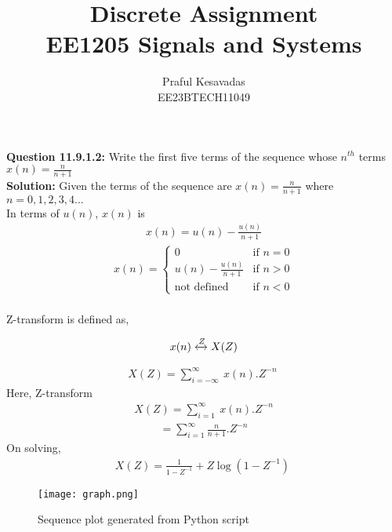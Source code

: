 \documentclass{article}
\begin{document}
\title{
\Huge\textbf{Discrete Assignment}\\
\Huge\textbf{EE1205} Signals and Systems\\
}
\large\author{Praful Kesavadas\\EE23BTECH11049}
\maketitle
\textbf{Question 11.9.1.2:}
Write the first five terms of the sequence whose $n^{th}$ terms  $x(n) = \frac{n}{n+1}$\\
\textbf{Solution:}
Given the terms of the sequence are $x(n) = \frac{n}{n+1}$ where $n = 0,1,2,3,4...$\\
In terms of $u(n)$, $x(n)$ is\\
\begin{align}
x(n) = u(n) -\frac{u(n)}{n+1}
\end{align}
\begin{align*}
    x(n) = 
    \begin{cases}
        0 & \text{if }n=0\\
        u(n) -\frac{u(n)}{n+1} & \text{if }n > 0\\
        \text{not defined } & \text{if }n <0
    \end{cases}
\end{align*}\\
Z-transform is defined as, 

$$ x(n) \xleftrightarrow Z  X(Z)$$

\begin{align}
X(Z) =  \sum_{i=-\infty}^\infty\ x(n).Z^{-n}\
\end{align}
Here, Z-transform
\begin{align}
X(Z) = \sum_{i=1}^\infty\ x(n).Z^{-n}
\end{align}
\begin{align}
= \sum_{i=1}^\infty \frac{n}{n+1} . Z^{-n}
\end{align}
On solving, 
\begin{align}
X(Z) = \frac{1}{1-Z^{-1}} + Z\log{(1-Z^{-1})}\
\end{align}
\begin{figure}[h]
    \centering
    \texttt{[image: graph.png]}
    \caption{Sequence plot generated from Python script}
    \label{fig:sequence-plot}
\end{figure}
\end{document}

